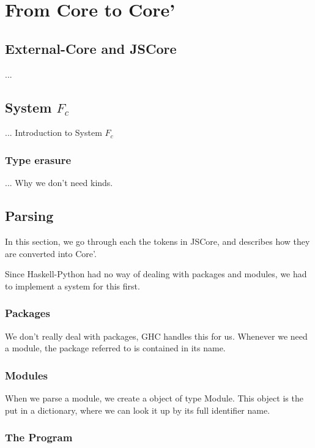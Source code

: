 

\chapter{From Core to Core'}


\section{External-Core and JSCore}

...

\section{System $F_c$}

... Introduction to System $F_c$

\cite{sulzmann2007system}


\subsection{Type erasure}

... Why we don't need kinds.


\section{Parsing}

In this section, we go through each the tokens in JSCore, and describes
how they are converted into Core'.

Since Haskell-Python had no way of dealing with packages and modules, 
we had to implement a system for this first.

\subsection{Packages}

We don't really deal with packages, GHC handles this for us. Whenever we
need a module, the package referred to is contained in its name.

\subsection{Modules}

When we parse a module, we create a object of type Module. This object is
the put in a dictionary, where we can look it up by its full identifier name.

\subsection{The Program}


